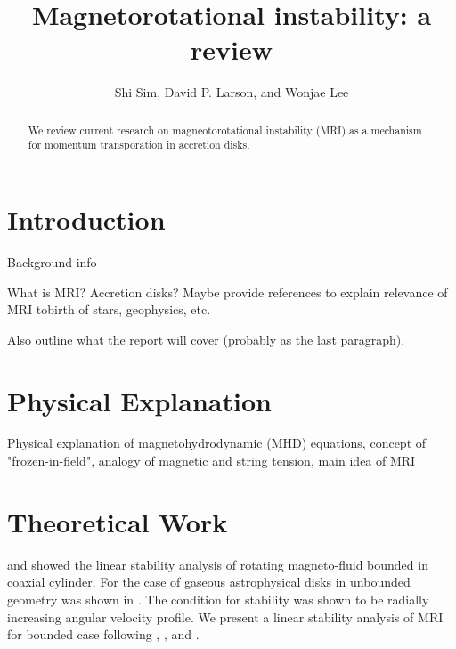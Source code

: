 \documentclass{jfm}
\title[Magnetorotational instability]{Magnetorotational instability: a review}
\author[S. Sim, D.~P. Larson, and W. Lee]{Shi Sim, David P. Larson, 
    and Wonjae Lee}
\affiliation{University of California, San Diego}
\begin{document}
\maketitle


\begin{abstract}
We review current research on magneotorotational instability (MRI) as a mechanism
for momentum transporation in accretion disks.
\end{abstract}


\section{Introduction}
\label{sec:intro}
Background info

What is MRI? Accretion disks? Maybe provide references to explain relevance of 
MRI tobirth of stars, geophysics, etc.

Also outline what the report will cover (probably as the last paragraph).



\section{Physical Explanation}
Physical explanation of magnetohydrodynamic (MHD) equations, concept of "frozen-in-field",
analogy of magnetic and string tension, main idea of MRI



\section{Theoretical Work}
\label{sec:theory}

\cite{Acheson1973} and \cite{Knobloch1992} showed the linear stability analysis of rotating magneto-fluid bounded in coaxial cylinder. For the case of gaseous astrophysical disks in unbounded geometry was shown in \cite{Balbus1991}. The condition for stability was shown to be radially increasing angular velocity profile. We present a linear stability analysis of MRI for bounded case following \cite{Acheson1972}, \cite{Acheson1973a}, \cite{Knobloch1992} and \cite{Julien2010}.
\end{document}
